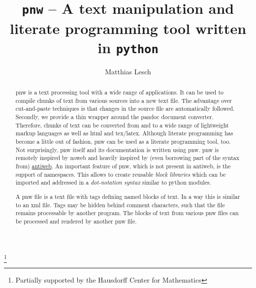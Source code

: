 \documentclass[neutral,proc,reqno]{ml-gen}
\begin{document}
\lstset{%
language=Python,
basicstyle=\small,
columns=fullflexible}

\title[\texttt{pnw}]{\texttt{pnw} -- A text manipulation and literate
programming tool written in \texttt{python}}

\author{Matthias Lesch}
\address{Mathematisches Institut,
Universit\"at Bonn,
Endenicher Allee 60,
53115 Bonn,
Germany}

%
\thanks{Partially supported by the 
        Hausdorff Center for Mathematics}


\begin{abstract}
pnw is a text processing tool with a wide range of applications. It can
be used to compile chunks of text from various sources into a new text
file. The advantage over cut-and-paste techniques is that changes in the
source file are automatically followed. Secondly, we provide a thin
wrapper around the pandoc document converter. Therefore, chunks of text
can be converted from and to a wide range of lightweight markup
languages as well as html and tex/latex. Although literate programming
has become a little out of fashion, pnw can be used as a literate
programming tool, too. Not surprisingly, pnw itself and its
documentation is written using pnw. pnw is remotely inspired by noweb
and heavily inspired by (even borrowing part of the syntax from)
\href{https://pypi.python.org/pypi/antiweb/0.2.2}{antiweb}. An important
feature of pnw, which is not present in antiweb, is the support of
namespaces. This allows to create reusable \emph{block libraries} which
can be imported and addressed in a \emph{dot-notation syntax} similar to
python modules.

A pnw file is a text file with tags defining named blocks of text. In a
way this is similar to an xml file. Tags may be hidden behind comment
characters, such that the file remains processable by another program.
The blocks of text from various pnw files can be processed and rendered
by another pnw file.

\end{abstract}

\maketitle
\tableofcontents
\end{document}
